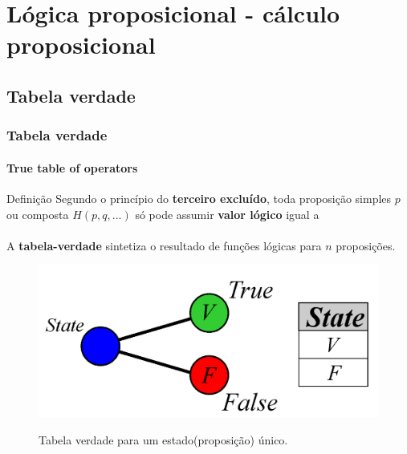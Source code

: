 \documentclass[10pt, headsepline, captions=tableabove,xcolor=table]{beamer}
\begin{document}
\section{Lógica proposicional - cálculo proposicional}
%
\subsection{Tabela verdade}
%
\begin{frame}[t]
    \frametitle{Tabela verdade}
    \framesubtitle{True table of operators}
    \begin{alertblock}{Definição}
        \small
        Segundo o princípio do \textbf{terceiro excluído}, toda proposição simples $p$ ou composta $H(p,q,...)$ só pode assumir \textbf{valor lógico} igual a \\ [1pt]
         \\ [4pt]
        A \textbf{tabela-verdade} sintetiza o resultado de funções lógicas para $n$ proposições.
    \end{alertblock}
    \vspace{-4mm}
    \begin{figure}[c]
        \centering
        \caption{Tabela verdade para um estado(proposição) único.}
        \includegraphics[scale=0.25]{TT2.png}
        \label{fig:tabela-verdade1}         
    \end{figure}
\end{frame}
%
\end{document}
